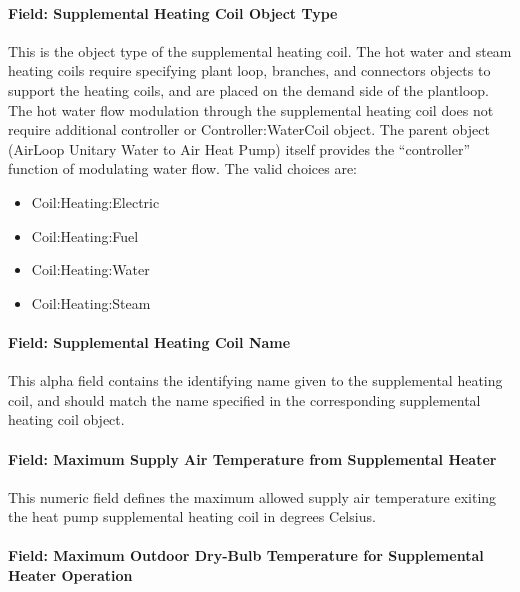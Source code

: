 \paragraph{Field: Supplemental Heating Coil Object Type}\label{field-supplemental-heating-coil-object-type-3}

This is the object type of the supplemental heating coil. The hot water and steam heating coils require specifying plant loop, branches, and connectors objects to support the heating coils, and are placed on the demand side of the plantloop. The hot water flow modulation through the supplemental heating coil does not require additional controller or Controller:WaterCoil object. The parent object (AirLoop Unitary Water to Air Heat Pump) itself provides the ``controller'' function of modulating water flow. The valid choices are:

\begin{itemize}
\item
  Coil:Heating:Electric
\item
  Coil:Heating:Fuel
\item
  Coil:Heating:Water
\item
  Coil:Heating:Steam
\end{itemize}

\paragraph{Field: Supplemental Heating Coil Name}\label{field-supplemental-heating-coil-name-3}

This alpha field contains the identifying name given to the supplemental heating coil, and should match the name specified in the corresponding supplemental heating coil object.

\paragraph{Field: Maximum Supply Air Temperature from Supplemental Heater}\label{field-maximum-supply-air-temperature-from-supplemental-heater-2}

This numeric field defines the maximum allowed supply air temperature exiting the heat pump supplemental heating coil in degrees Celsius.

\paragraph{Field: Maximum Outdoor Dry-Bulb Temperature for Supplemental Heater Operation}\label{field-maximum-outdoor-dry-bulb-temperature-for-supplemental-heater-operation-3}

